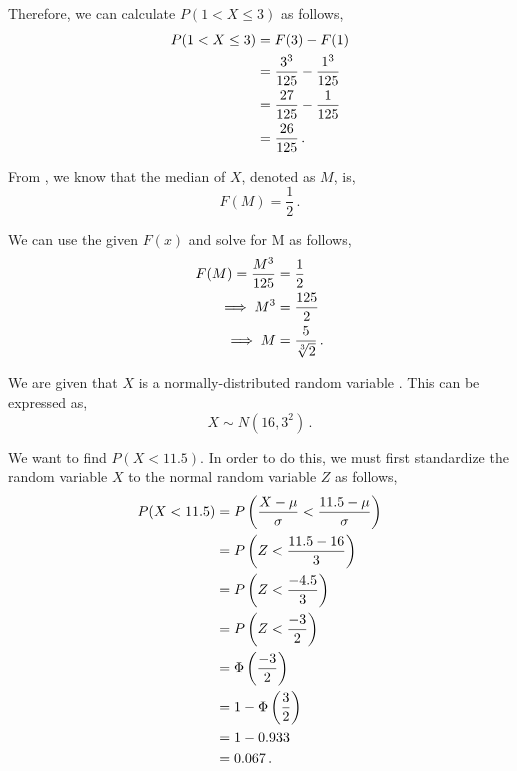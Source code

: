\begin{subquestions}
\begin{subsubquestions}
Therefore, we can calculate $P(1 < X \leq 3)$ as follows,
\begin{align}
	P( 1 < X \leq 3) & = F(3) - F(1) \nonumber \\
	                 & = \frac{3^3}{125} - \frac{1^3}{125} \nonumber \\
	                 & = \frac{27}{125} - \frac{1}{125} \nonumber \\
	                 & = \frac{26}{125} \,.
\end{align}


\subsubquestion

From , we know that the median of $X$, denoted as $M$, is,
\begin{equation}
	F(M) = \frac{1}{2} \,.
\end{equation}

We can use the given $F(x)$ and solve for M as follows,
\begin{align}
	F(M) = \frac{M^3}{125} & = \frac{1}{2} \nonumber \\
	        \implies M^3 & = \frac{125}{2} \nonumber \\
	        \implies M & = \frac{5}{\sqrt[3]{2}} \,.
\end{align}

\end{subsubquestions}
	
	
\subquestion

We are given that $X$ is a normally-distributed random variable . This can be expressed as,
\begin{equation}
	X \sim N(16, 3^2) \,.
\end{equation}

\begin{subsubquestions}
	
\subsubquestion

We want to find $P(X<11.5)$. In order to do this, we must first standardize the random variable $X$ to the normal random variable $Z$ as follows,
\begin{align}
	P(X<11.5) & = P\left(\frac{X- \mu}{\sigma} < \frac{11.5- \mu}{\sigma}\right) \nonumber \\
	          & = P\left(Z < \frac{11.5- 16}{3}\right) \nonumber \\
	          & = P\left(Z < \frac{-4.5}{3}\right) \nonumber \\
	          & = P\left(Z < \frac{-3}{2}\right) \nonumber \\
	          & = \Phi\left(\frac{-3}{2}\right) \nonumber \\
	          & = 1 - \Phi\left(\frac{3}{2} \right) \nonumber \\
	          & = 1 - 0.933 \nonumber \\
	          & = 0.067 \,.
\end{align}


\end{subsubquestions}
\end{subquestions}
